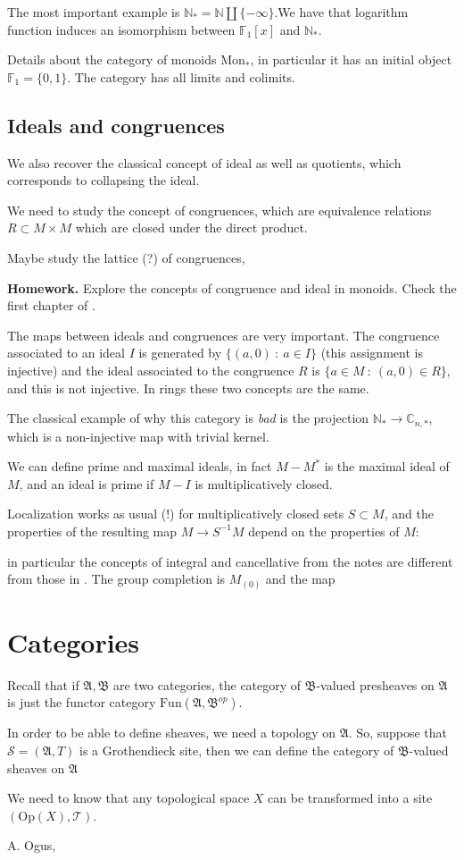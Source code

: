 \documentclass{article}
\begin{document}
The most important example is $\mathbb{N}_*=\mathbb{N}\coprod\{-\infty\}$.We have that logarithm function induces an isomorphism between  $\mathbb{F}_1[x]$ and $\mathbb{N}_*$.

Details about the category of monoids $\text{Mon}_*$, in particular it has an initial object $\mathbb{F}_1=\{0,1\}$. The category has all limits and colimits.
\subsection{Ideals and congruences}
We also recover the classical concept of ideal as well as quotients, which corresponds to collapsing the ideal. 

We need to study the concept of congruences, which are equivalence relations $R\subset M\times M$ which are closed under the direct product. 

Maybe  study the lattice (?) of congruences, 

{\bf Homework. }Explore the concepts of congruence and ideal in monoids. Check the first chapter of \cite{AO}.

 The maps between ideals and congruences are very important. The congruence associated to an ideal $I$ is generated by $\{(a,0)\::\:a\in I\}$ (this assignment is injective) and the ideal associated to the congruence $R$ is $\{a\in M\::\:(a,0)\in R\}$, and this is not injective. In rings these two concepts are the same.
 
 The classical example of why this category is {\it bad} is the projection $\mathbb{N}_*\xrightarrow{}\mathbb{C}_{n,*}$, which is a non-injective map with trivial kernel.
 
 We can define prime and maximal ideals, in fact $M-M^*$ is the maximal ideal of $M$, and an ideal is prime if $M-I$ is multiplicatively closed.
 
 Localization works as usual (!) for multiplicatively closed sets $S\subset M$, and the properties of the resulting map $M\xrightarrow{}S^{-1}M$ depend on the properties of $M$:
 
 in particular the concepts of integral and cancellative from the notes are different from those in \cite{AO}. The group completion is $M_{(0)}$ and the map   
\appendix
\section{Categories}
\label{Appendix_Categories}
Recall that if $\mathfrak{A},\mathfrak{B}$ are two categories, the category of $\mathfrak{B}$-valued presheaves on $\mathfrak{A}$ is just the functor category $\text{Fun}(\mathfrak{A},\mathfrak{B}^{op})$. 

In order to be able to define sheaves, we need a topology on $\mathfrak{A}$. So, suppose that $\mathcal{S}=(\mathfrak{A},T)$ is a Grothendieck site, then we can define the category of $\mathfrak{B}$-valued sheaves on $\mathfrak{A}$ 

We need to know that any topological space $X$ can be transformed into a site $(\text{Op}(X),\mathcal{T})$.
\begin{thebibliography}{100}
 A. Ogus, 
\end{thebibliography}
\end{document}
